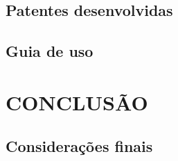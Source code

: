 \section{Patentes desenvolvidas}
\label{sec:pat}

\section{Guia de uso}
\label{sec:guiuso}

\chapter{CONCLUSÃO}
\label{chap:concl}

\section{Considerações finais}
\label{sec:consfin}

